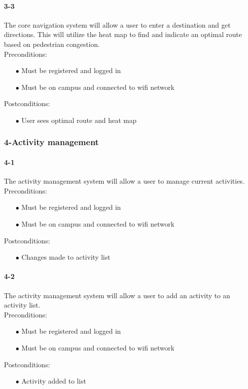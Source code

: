 \documentclass[a4paper,12pt]{article}
\begin{document}
\paragraph{3-3}
The core navigation system will allow a user to enter a destination and get directions. This will utilize the heat map to find and indicate an optimal route based on pedestrian congestion.\\
Preconditions:
\begin{itemize}
	\item[$\bullet$] Must be registered and logged in
	\item[$\bullet$] Must be on campus and connected to wifi network
\end{itemize}
Postconditions:
\begin{itemize}
	\item[$\bullet$] User sees optimal route and heat map
\end{itemize}
\subsubsection{4-Activity management}
\paragraph{4-1}
The activity management system will allow a user to manage current activities.\\
Preconditions:
\begin{itemize}
	\item[$\bullet$] Must be registered and logged in
	\item[$\bullet$] Must be on campus and connected to wifi network
\end{itemize}
Postconditions:
\begin{itemize}
	\item[$\bullet$] Changes made to activity list
\end{itemize}
\paragraph{4-2}
The activity management system will allow a user to add an activity to an activity list.\\
Preconditions:
\begin{itemize}
	\item[$\bullet$] Must be registered and logged in
	\item[$\bullet$] Must be on campus and connected to wifi network
\end{itemize}
Postconditions:
\begin{itemize}
	\item[$\bullet$] Activity added to list
\end{itemize}
\end{document}
